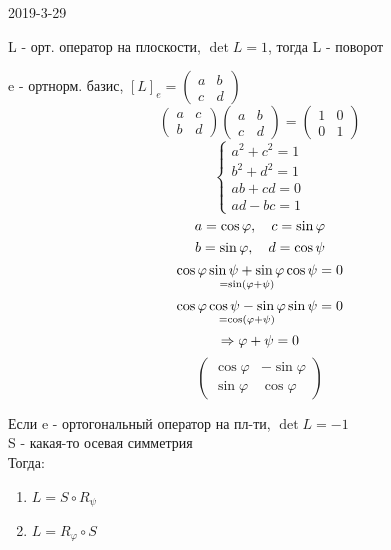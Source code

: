 \documentclass[main]{subfiles}
\begin{document}
  \begin{lect}{2019-3-29}
    \begin{definition}
      L - орт. оператор на плоскости, $\det L = 1$, тогда L - поворот
    \end{definition}

    e - ортнорм. базис, $[L]_e = \begin{pmatrix}
      a & b\\
      c & d
    \end{pmatrix}$
    \[\begin{pmatrix}
      a & c\\
      b & d
    \end{pmatrix} \begin{pmatrix}
      a & b\\
      c & d
    \end{pmatrix} = \begin{pmatrix}
      1 & 0\\
      0 & 1
    \end{pmatrix}\]
    \[\begin{cases}
      a^2 + c^2 = 1\\
      b^2 + d^2 = 1\\
      ab + cd = 0\\
      ad - bc = 1
    \end{cases}\]
    \[a = \cos \varphi,\quad c = \sin \varphi\]
    \[b = \sin \varphi,\quad d = \cos \psi\]
    \[\underset{= \sin(\varphi + \psi)}{\cos \varphi \sin \psi + \sin \varphi \cos \psi} = 0\]
    \[\underset{= \cos(\varphi + \psi)}{\cos \varphi \cos \psi - \sin \varphi \sin \psi} = 0\]
    \[\Rightarrow \varphi + \psi = 0\]
    \[\begin{pmatrix}
      \cos \varphi & - \sin \varphi\\
      \sin \varphi & \cos \varphi
    \end{pmatrix}\]

    \begin{definition}
      Если e - ортогональный оператор на пл-ти, $\det L = -1$\\
      S - какая-то осевая симметрия\\
      Тогда:
      \begin{enumerate}
        \item $L = S \circ R_{\psi}$
        \item $L = R_{\varphi} \circ S$
      \end{enumerate}
    \end{definition}


\end{lect}
\end{document}
